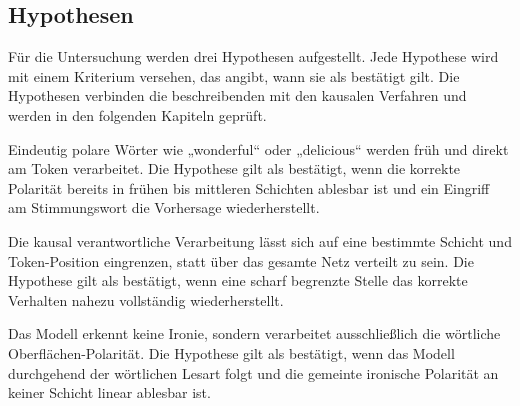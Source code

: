 \subsection{Hypothesen}
Für die Untersuchung werden drei Hypothesen aufgestellt. Jede Hypothese wird mit einem Kriterium versehen, das angibt, wann sie als bestätigt gilt. Die Hypothesen verbinden die beschreibenden mit den kausalen Verfahren und werden in den folgenden Kapiteln geprüft.

\begin{description}[style=nextline, leftmargin=0pt, font=\bfseries]
  \item[H1 (klare Stimmungswörter)] Eindeutig polare Wörter wie „wonderful“ oder „delicious“ werden früh und direkt am Token verarbeitet. Die Hypothese gilt als bestätigt, wenn die korrekte Polarität bereits in frühen bis mittleren Schichten ablesbar ist und ein Eingriff am Stimmungswort die Vorhersage wiederherstellt.
  \item[H2 (Lokalisierbarkeit)] Die kausal verantwortliche Verarbeitung lässt sich auf eine bestimmte Schicht und Token-Position eingrenzen, statt über das gesamte Netz verteilt zu sein. Die Hypothese gilt als bestätigt, wenn eine scharf begrenzte Stelle das korrekte Verhalten nahezu vollständig wiederherstellt.
  \item[H3 (Ironie und Sarkasmus)] Das Modell erkennt keine Ironie, sondern verarbeitet ausschließlich die wörtliche Oberflächen-Polarität. Die Hypothese gilt als bestätigt, wenn das Modell durchgehend der wörtlichen Lesart folgt und die gemeinte ironische Polarität an keiner Schicht linear ablesbar ist.
\end{description}